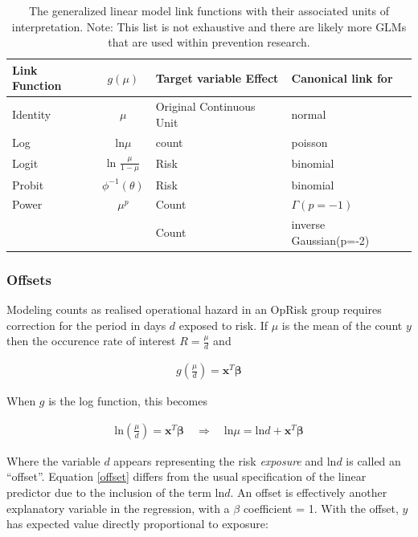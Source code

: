 \documentclass[]{article}
\begin{document}
\begin{table}[tb]
\centering
\caption{The generalized linear model link functions with their associated units of interpretation. Note: This list is not exhaustive and there are likely more GLMs that are used within prevention research.} 
\label{tab_linkfcn}
\begin{tabular}{lcll}
\toprule
Link Function & $g(\mu)$ & Target variable Effect & Canonical link for \\ 
\midrule
Identity & $\mu$ & Original Continuous Unit & normal \\ 
  Log & ln$\mu$ & count & poisson \\ 
  Logit & ln $\frac{\mu}{1-\mu}$ & Risk & binomial \\ 
  Probit & $\phi^{-1}(\theta)$ & Risk & binomial \\ 
  Power & $\mu^p$ & Count & $\Gamma(p=-1)$\\
        &       & Count & inverse Gaussian(p=-2)\\
\bottomrule
\end{tabular}
\end{table}

\subsubsection{Offsets}

Modeling counts as realised operational hazard in an OpRisk group
requires correction for the period in days \(d\) exposed to risk. If
\(\mu\) is the mean of the count \(y\) then the occurence rate of
interest \(R= \frac{\mu}{d}\) and

\singlespacing

\begin{eqnarray}
g\left(\frac{\mu}{d}\right) = \mathbf{x}^T\mathbf{\beta}
\end{eqnarray} \doublespacing

When \(g\) is the log function, this becomes

\singlespacing

\begin{eqnarray}\label{offset}
\mbox{ln}\left(\frac{\mu}{d}\right) = \mathbf{x}^T\mathbf{\beta} \quad \Rightarrow \quad \mbox{ln}\mu = \mbox{ln}d + \mathbf{x}^T\mathbf{\beta}
\end{eqnarray} \doublespacing

Where the variable \(d\) appears representing the risk \emph{exposure}
and ln\(d\) is called an ``offset''. Equation \ref{offset} differs from
the usual specification of the linear predictor due to the inclusion of
the term ln\(d\). An offset is effectively another explanatory variable
in the regression, with a \(\beta\) coefficient = 1. With the offset,
\(y\) has expected value directly proportional to exposure:
\end{document}
